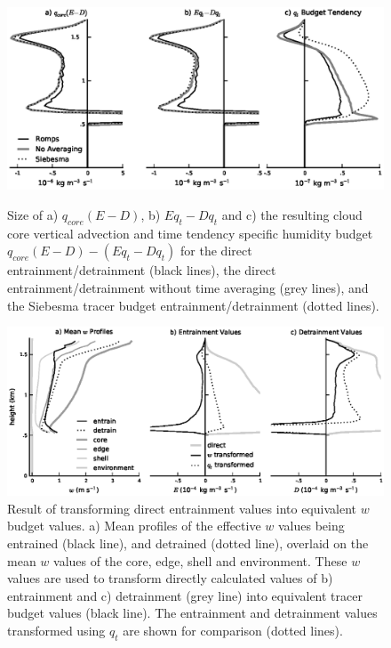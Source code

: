 \documentclass[12pt]{article}
\begin{document}
\begin{figure}[t]
  \noindent\includegraphics[width=39pc]{./figures/numerical_error}\\
  \caption{Size of a) $q_{core}(E-D)$, b) $Eq_t-Dq_t$ and c) the resulting 
  cloud core vertical advection and time tendency specific humidity budget 
  $q_{core}(E-D) - (Eq_t-Dq_t)$ for the direct entrainment/detrainment 
  (black lines), the direct entrainment/detrainment without time averaging 
  (grey lines), and the Siebesma tracer budget entrainment/detrainment 
  (dotted lines).}
  \label{fig:numerical_error}
\end{figure}

\begin{figure}[t]
  \noindent\includegraphics[width=39pc]{./figures/reynolds_correction_w}
  \caption{Result of transforming direct entrainment values into equivalent 
  $w$ budget values.  a) Mean profiles of the effective $w$ values being
  entrained (black line), and detrained (dotted line), overlaid on the mean 
  $w$ values of the core, edge, shell and environment.  These $w$ values are
  used to transform directly calculated values of b) entrainment and 
  c) detrainment (grey line) into equivalent tracer budget values (black 
  line).  The entrainment and detrainment values transformed using $q_t$ 
  are shown for comparison (dotted lines).}
  \label{fig:Reynolds_correction_w}
\end{figure}
\end{document}
